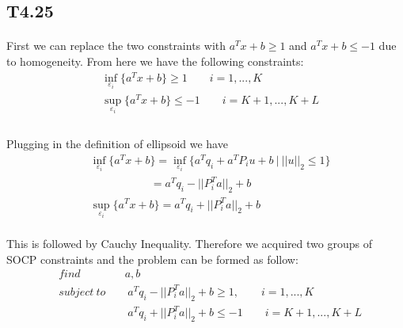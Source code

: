 \subsection*{T4.25}
\paragraph{}
First we can replace the two constraints with $a^Tx +b \geq 1$ and $a^Tx+b \leq -1$ due to homogeneity. From here we have the following constraints:
\begin{align*}
&\inf_{\varepsilon_i}\{a^Tx +b\}  \geq 1 \qquad i=1,...,K \\
&\sup_{\varepsilon_i}\{a^Tx +b\}  \leq -1 \qquad i=K+1,...,K+L\\
\end{align*}
\paragraph{}
Plugging in the definition of ellipsoid we have
\begin{align*}
&\inf_{\varepsilon_i}\{a^Tx +b\} = \inf_{\varepsilon_i}\{a^Tq_i +a^TP_iu +b\ |\ ||u||_2 \leq 1\} \\
& \qquad \qquad \quad \ \ =  a^Tq_i -||P_i^Ta||_2 +b\\
&\sup_{\varepsilon_i}\{a^Tx +b\} =a^Tq_i +||P_i^Ta||_2 +b
\end{align*}
\paragraph{}
This is followed by Cauchy Inequality. Therefore we acquired two groups of SOCP constraints and the problem can be formed as follow:
\begin{align*}
&find \qquad  \qquad a, b \\
&subject \ to \qquad   a^Tq_i -||P_i^Ta||_2 +b \geq  1, \qquad i=1,...,K \\
&\qquad \qquad \qquad \ a^Tq_i +||P_i^Ta||_2 +b \leq -1 \qquad i=K+1,...,K+L\\
\end{align*}